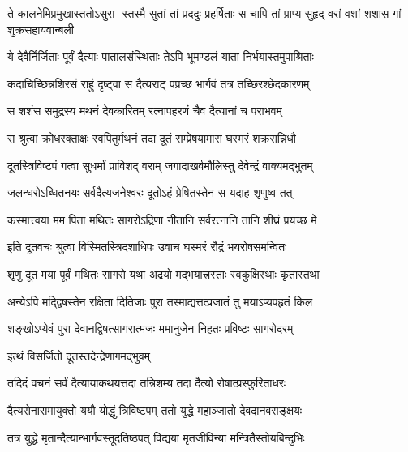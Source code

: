\fourlineindentedshloka
{ते कालनेमिप्रमुखास्ततोऽसुरा-}
{स्तस्मै सुतां तां प्रददुः प्रहर्षिताः}
{स चापि तां प्राप्य सुहृद् वरां वशां}
{शशास गां शुक्रसहायवान्बली} %





\twolineshloka
{ये देवैर्निर्जिताः पूर्वं दैत्याः पातालसंस्थिताः}
{तेऽपि भूमण्डलं याता निर्भयास्तमुपाश्रिताः} %

\twolineshloka
{कदाचिच्छिन्नशिरसं राहुं दृष्ट्वा स दैत्यराट्}
{पप्रच्छ भार्गवं तत्र तच्छिरश्छेदकारणम्} %

\twolineshloka
{स शशंस समुद्रस्य मथनं देवकारितम्}
{रत्नापहरणं चैव दैत्यानां च पराभवम्} %

\twolineshloka
{स श्रुत्वा क्रोधरक्ताक्षः स्वपितुर्मथनं तदा}
{दूतं सम्प्रेषयामास घस्मरं शक्रसन्निधौ} %

\twolineshloka
{दूतस्त्रिविष्टपं गत्वा सुधर्मां प्राविशद् वराम्}
{जगादाखर्वमौलिस्तु देवेन्द्रं वाक्यमद्भुतम्} %


\twolineshloka
{जलन्धरोऽब्धितनयः सर्वदैत्यजनेश्वरः}
{दूतोऽहं प्रेषितस्तेन स यदाह शृणुष्व तत्} %

\twolineshloka
{कस्मात्त्वया मम पिता मथितः सागरोऽद्रिणा}
{नीतानि सर्वरत्नानि तानि शीघ्रं प्रयच्छ मे} %

\twolineshloka
{इति दूतवचः श्रुत्वा विस्मितस्त्रिदशाधिपः}
{उवाच घस्मरं रौद्रं भयरोषसमन्वितः} %


\twolineshloka
{शृणु दूत मया पूर्वं मथितः सागरो यथा}
{अद्रयो मद्भयात्त्रस्ताः स्वकुक्षिस्थाः कृतास्तथा} %

\twolineshloka
{अन्येऽपि मद्द्विषस्तेन रक्षिता दितिजाः पुरा}
{तस्माद्यत्तत्प्रजातं तु मयाऽप्यपहृतं किल} %

\twolineshloka
{शङ्खोऽप्येवं पुरा देवानद्विषत्सागरात्मजः}
{ममानुजेन निहतः प्रविष्टः सागरोदरम्} %




\onelineshloka
{इत्थं विसर्जितो दूतस्तदेन्द्रेणागमद्भुवम्} %

\twolineshloka
{तदिदं वचनं सर्वं दैत्यायाकथयत्तदा}
{तन्निशम्य तदा दैत्यो रोषात्प्रस्फुरिताधरः} %

\twolineshloka
{दैत्यसेनासमायुक्तो ययौ योद्धुं त्रिविष्टपम्}
{ततो युद्धे महाञ्जातो देवदानवसङ्क्षयः} %

\twolineshloka
{तत्र युद्धे मृतान्दैत्यान्भार्गवस्तूदतिष्ठपत्}
{विद्यया मृतजीविन्या मन्त्रितैस्तोयबिन्दुभिः} %

